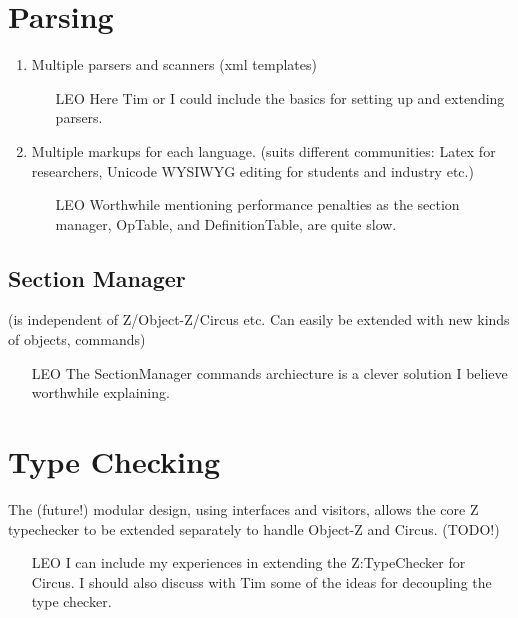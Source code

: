 \documentclass{llncs}
\begin{document}
\section{Parsing}

  \begin{enumerate}
    \item Multiple parsers and scanners (xml templates)
        \begin{itemize}
            \item[LEO] Here Tim or I could include the basics for setting up and extending parsers.
        \end{itemize}

    \item Multiple markups for each language.
      (suits different communities:  Latex for researchers,
      Unicode WYSIWYG editing for students and industry etc.)
      \begin{itemize}
         \item[LEO] Worthwhile mentioning performance penalties as the section manager,
                OpTable, and DefinitionTable, are quite slow.
      \end{itemize}
  \end{enumerate}

\subsection{Section Manager}

  (is independent of Z/Object-Z/Circus etc.
  Can easily be extended with new kinds of objects, commands)

    \begin{itemize}
        \item[LEO] The SectionManager commands archiecture is a clever solution I believe worthwhile explaining.
    \end{itemize}

\section{Type Checking}

      The (future!) modular design, using interfaces and visitors,
      allows the core Z typechecker to be extended separately
      to handle Object-Z and Circus.  (TODO!)

    \begin{itemize}
        \item[LEO] I can include my experiences in extending the Z:TypeChecker for Circus.
                    I should also discuss with Tim some of the ideas for decoupling the type checker.
    \end{itemize}
\end{document}
